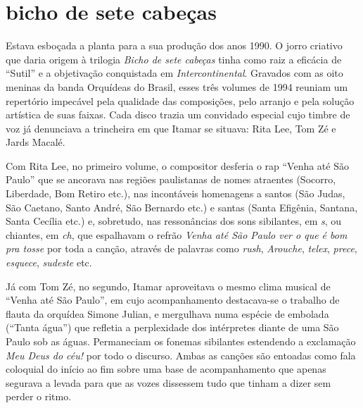 \section{bicho de sete cabeças}

Estava esboçada a planta para a sua produção dos anos 1990. O jorro
criativo que daria origem à trilogia \textit{Bicho de sete cabeças} tinha como raiz
a eficácia de ``Sutil'' e a objetivação conquistada em \textit{Intercontinental}.
Gravados com as oito meninas da banda Orquídeas do Brasil, esses três
volumes de 1994 reuniam um repertório impecável pela qualidade das
composições, pelo arranjo e pela solução artística de suas faixas. Cada
disco trazia um convidado especial cujo timbre de voz já denunciava a
trincheira em que Itamar se situava: Rita Lee, Tom Zé e Jards Macalé.

Com Rita Lee, no primeiro volume, o compositor desferia o rap ``Venha até
São Paulo'' que se ancorava nas regiões paulistanas de nomes atraentes (Socorro, Liberdade, Bom Retiro etc.), nas incontáveis homenagens a
santos (São Judas, São Caetano, Santo André, São Bernardo etc.) e santas
(Santa Efigênia, Santana, Santa Cecília etc.) e, sobretudo, nas
ressonâncias dos sons sibilantes, em \textit{s}, ou chiantes, em \textit{ch}, que
espalhavam o refrão \textit{Venha até São Paulo ver o que é bom pra tosse}
por toda a canção, através de palavras como \textit{rush}, \textit{Arouche},
\textit{telex}, \textit{prece}, \textit{esquece}, \textit{sudeste} etc.

Já com Tom Zé, no segundo, Itamar aproveitava o mesmo clima musical de
``Venha até São Paulo'', em cujo acompanhamento destacava-se o trabalho de
flauta da orquídea Simone Julian, e mergulhava numa espécie de embolada
(``Tanta água'') que refletia a perplexidade dos intérpretes diante de uma
São Paulo sob as águas. Permaneciam os fonemas sibilantes estendendo a
exclamação \textit{Meu Deus do céu!} por todo o discurso. Ambas as canções
são entoadas como fala coloquial do início ao fim sobre uma base de
acompanhamento que apenas segurava a levada para que as vozes dissessem
tudo que tinham a dizer sem perder o ritmo.

